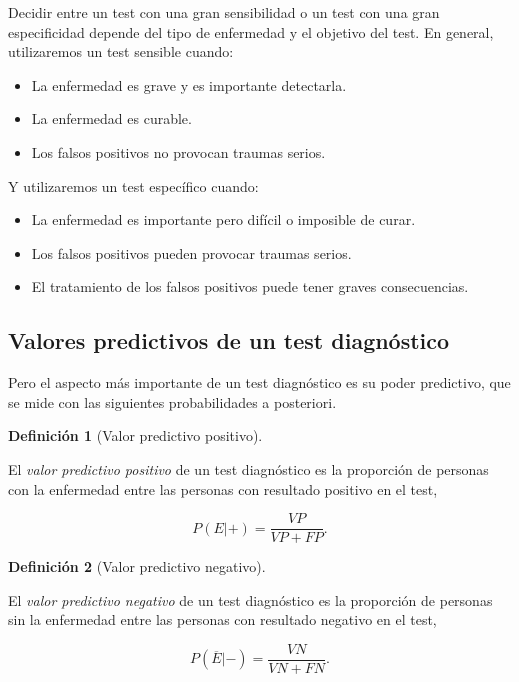 \documentclass[
  spanish,
  a4paper,
]{scrreport}
\providecommand{\tightlist}{%
  \setlength{\itemsep}{0pt}\setlength{\parskip}{0pt}}
\theoremstyle{plain}
\theoremstyle{definition}
\theoremstyle{definition}
\newtheorem{definition}{Definición}[chapter]
\theoremstyle{remark}
\begin{document}
Decidir entre un test con una gran sensibilidad o un test con una gran
especificidad depende del tipo de enfermedad y el objetivo del test. En
general, utilizaremos un test sensible cuando:

\begin{itemize}
\tightlist
\item
  La enfermedad es grave y es importante detectarla.
\item
  La enfermedad es curable.
\item
  Los falsos positivos no provocan traumas serios.
\end{itemize}

Y utilizaremos un test específico cuando:

\begin{itemize}
\tightlist
\item
  La enfermedad es importante pero difícil o imposible de curar.
\item
  Los falsos positivos pueden provocar traumas serios.
\item
  El tratamiento de los falsos positivos puede tener graves
  consecuencias.
\end{itemize}

\subsection{Valores predictivos de un test
diagnóstico}\label{valores-predictivos-de-un-test-diagnuxf3stico}

Pero el aspecto más importante de un test diagnóstico es su poder
predictivo, que se mide con las siguientes probabilidades a posteriori.

\begin{definition}[Valor predictivo
positivo]\protect\hypertarget{def-valor-predictivo-positivo}{}\label{def-valor-predictivo-positivo}

El \emph{valor predictivo positivo} de un test diagnóstico es la
proporción de personas con la enfermedad entre las personas con
resultado positivo en el test,

\[P(E|+) = \frac{VP}{VP+FP}.\]

\end{definition}

\begin{definition}[Valor predictivo
negativo]\protect\hypertarget{def-valor-predictivo-negativo}{}\label{def-valor-predictivo-negativo}

El \emph{valor predictivo negativo} de un test diagnóstico es la
proporción de personas sin la enfermedad entre las personas con
resultado negativo en el test,

\[P(\overline{E}|-) = \frac{VN}{VN+FN}.\]

\end{definition}
\end{document}
